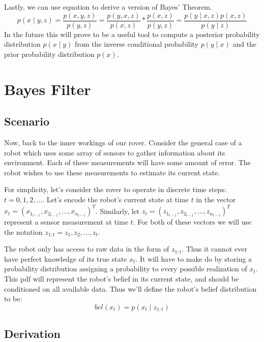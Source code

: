 Lastly, we can use equation  to derive a version of Bayes' Theorem. 
\begin{equation} \label{eqBayesThm}
p(x \mathbin{\vert} y,z) = \frac{p(x,y,z)}{p(y,z)} = \frac{p(y,x,z)}{p(x,z)} * \frac{p(x,z)}{p(y,z)} = \frac{p(y \mathbin{\vert} x,z)p(x,z)}{p(y \mathbin{\vert} z)}
\end{equation}
In the future this will prove to be a useful tool to compute a posterior probability distribution \(p(x \mathbin{\vert} y)\) from the inverse conditional probability \(p(y \mathbin{\vert} x)\) and the prior probability distribution \(p(x)\).

\section{Bayes Filter}
\subsection{Scenario}
Now, back to the inner workings of our rover. Consider the general case of a robot which uses some array of sensors to gather information about its environment. Each of these measurements will have some amount of error. The robot wishes to use these measurements to estimate its current state. \cite{probabilisticRobotics}

For simplicity, let's consider the rover to operate in discrete time steps: \(t=0,1,2,...\). Let's encode the robot's current state at time \(t\) in the vector \(x_t = (x_{1_{t-1}}, x_{2_{t-1}}, ... , x_{n_{t-1}})^T\). Similarly, let \(z_t = (z_{1_{t-1}}, z_{2_{t-1}}, ... , z_{n_{t-1}})^T\) represent a sensor measurement at time \(t\). For both of these vectors we will use the notation \(z_{1:t} = z_1, z_2, ..., z_t\).

The robot only has access to raw data in the form of \(z_{1:t}\). Thus it cannot ever have perfect knowledge of its true state \(x_t\). It will have to make do by storing a probability distribution assigning a probability to every possible realization of \(x_t\). This pdf will represent the robot's belief in its current state, and should be conditioned on all available data. Thus we'll define the robot's belief distribution to be:
\begin{equation} \label{eqBel}
bel(x_t) = p(x_t \mathbin{\vert} z_{1:t})
\end{equation}

\subsection{Derivation}

